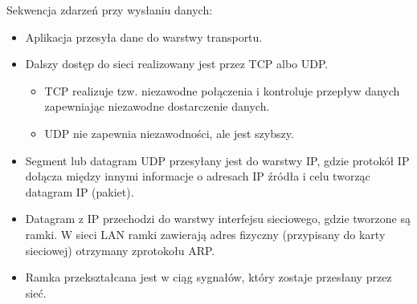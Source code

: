 \documentclass[../main.tex]{subfiles}
\begin{document}
    Sekwencja zdarzeń przy wysłaniu danych:
    \begin{itemize}
        \item Aplikacja przesyła dane do warstwy transportu.
        \item Dalszy dostęp do sieci realizowany jest przez TCP albo UDP.
        \begin{itemize}
            \item TCP realizuje tzw. niezawodne połączenia i kontroluje przepływ danych zapewniając niezawodne dostarczenie danych.
            \item UDP nie zapewnia niezawodności, ale jest szybszy.
        \end{itemize}
        \item Segment lub datagram UDP przesyłany jest do warstwy IP, gdzie protokół IP dołącza między innymi informacje o adresach IP źródła i celu tworząc datagram IP (pakiet).
        \item Datagram z IP przechodzi do warstwy interfejsu sieciowego, gdzie tworzone są ramki. W sieci LAN ramki zawierają adres fizyczny (przypisany do karty sieciowej) otrzymany zprotokołu ARP.
        \item Ramka przekształcana jest w ciąg sygnałów, który zostaje przesłany przez sieć.
    \end{itemize}
\end{document}
